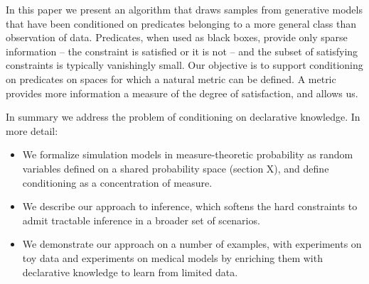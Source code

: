 In this paper we present an algorithm that draws samples from generative models that have been conditioned on predicates belonging to a more general class than observation of data.
Predicates, when used as black boxes, provide only sparse information -- the constraint is satisfied or it is not -- and the subset of satisfying constraints is typically vanishingly small.
Our objective is to support conditioning on predicates on spaces for which a natural metric can be defined.
A metric provides more information a measure of the degree of satisfaction, and allows us.

In summary we address the problem of conditioning on declarative knowledge.
In more detail:
\begin{itemize}
\item We formalize simulation models in measure-theoretic probability as random variables defined on a shared probability space (section X), and define conditioning as a concentration of measure.
\item We describe our approach to inference, which softens the hard constraints to admit tractable inference in a broader set of scenarios.
\item  We demonstrate our approach on a number of examples, with experiments on toy data and experiments on medical models by enriching them with declarative knowledge to learn from limited data.
\end{itemize}
